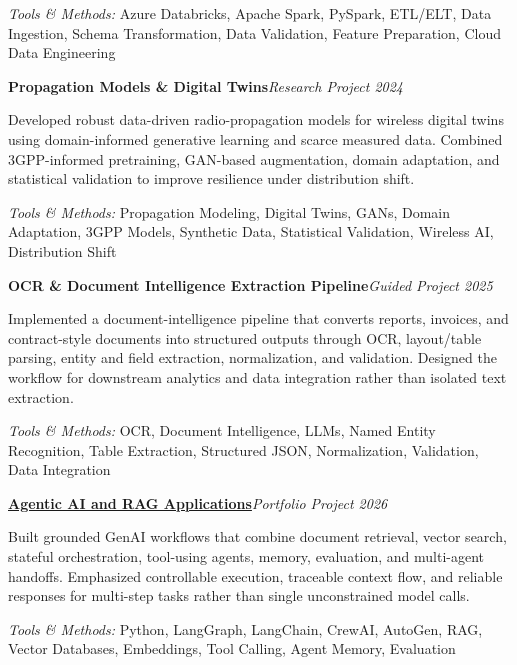 \documentclass[9pt,letterpaper]{extarticle}
\newcommand{\entry}[2]{\Needspace{4\baselineskip}\textbf{#1}\hfill\textit{#2}\par}
\begin{document}
{\small\textit{Tools \& Methods:} Azure Databricks, Apache Spark, PySpark, ETL/ELT, Data Ingestion, Schema Transformation, Data Validation, Feature Preparation, Cloud Data Engineering\par}
\vspace{1pt}
\entry{Propagation Models \& Digital Twins}{Research Project \textbar{} 2024}
Developed robust data-driven radio-propagation models for wireless digital twins using domain-informed generative learning and scarce measured data. Combined 3GPP-informed pretraining, GAN-based augmentation, domain adaptation, and statistical validation to improve resilience under distribution shift.\par
{\small\textit{Tools \& Methods:} Propagation Modeling, Digital Twins, GANs, Domain Adaptation, 3GPP Models, Synthetic Data, Statistical Validation, Wireless AI, Distribution Shift\par}
\vspace{1pt}
\entry{OCR \& Document Intelligence Extraction Pipeline}{Guided Project \textbar{} 2025}
Implemented a document-intelligence pipeline that converts reports, invoices, and contract-style documents into structured outputs through OCR, layout/table parsing, entity and field extraction, normalization, and validation. Designed the workflow for downstream analytics and data integration rather than isolated text extraction.\par
{\small\textit{Tools \& Methods:} OCR, Document Intelligence, LLMs, Named Entity Recognition, Table Extraction, Structured JSON, Normalization, Validation, Data Integration\par}
\vspace{1pt}
\entry{\href{https://github.com/WaseemRaza844/agentic-ai-projects-by-was}{Agentic AI and RAG Applications}}{Portfolio Project \textbar{} 2026}
Built grounded GenAI workflows that combine document retrieval, vector search, stateful orchestration, tool-using agents, memory, evaluation, and multi-agent handoffs. Emphasized controllable execution, traceable context flow, and reliable responses for multi-step tasks rather than single unconstrained model calls.\par
{\small\textit{Tools \& Methods:} Python, LangGraph, LangChain, CrewAI, AutoGen, RAG, Vector Databases, Embeddings, Tool Calling, Agent Memory, Evaluation\par}
\vspace{1pt}
\end{document}
